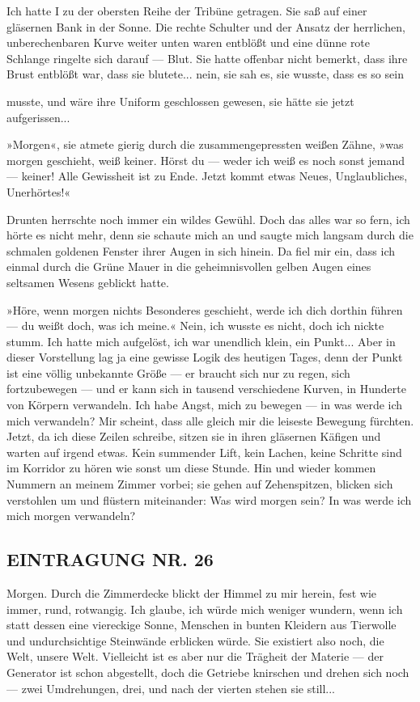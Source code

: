 Ich hatte I zu der obersten Reihe der Tribüne getragen. Sie saß auf
einer gläsernen Bank in der Sonne. Die rechte Schulter und der
Ansatz der herrlichen, unberechenbaren Kurve weiter unten waren
entblößt und eine dünne rote Schlange ringelte sich darauf — Blut.
Sie hatte offenbar nicht bemerkt, dass ihre Brust entblößt war,
dass sie blutete... nein, sie sah es, sie wusste, dass es so sein

musste, und wäre ihre Uniform geschlossen gewesen, sie hätte sie
jetzt aufgerissen...

»Morgen«, sie atmete gierig durch die zusammengepressten weißen
Zähne, »was morgen geschieht, weiß keiner. Hörst du — weder ich
weiß es noch sonst jemand — keiner! Alle Gewissheit ist zu Ende.
Jetzt kommt etwas Neues, Unglaubliches, Unerhörtes!«

Drunten herrschte noch immer ein wildes Gewühl. Doch das alles war
so fern, ich hörte es nicht mehr, denn sie schaute mich an und
saugte mich langsam durch die schmalen goldenen Fenster ihrer Augen
in sich hinein. Da fiel mir ein, dass ich einmal durch die Grüne
Mauer in die geheimnisvollen gelben Augen eines seltsamen Wesens
geblickt hatte.

»Höre, wenn morgen nichts Besonderes geschieht, werde ich dich
dorthin führen — du weißt doch, was ich meine.« Nein, ich wusste es
nicht, doch ich nickte stumm. Ich hatte mich aufgelöst, ich war
unendlich klein, ein Punkt... Aber in dieser Vorstellung lag ja
eine gewisse Logik des heutigen Tages, denn der Punkt ist eine
völlig unbekannte Größe — er braucht sich nur zu regen, sich
fortzubewegen — und er kann sich in tausend verschiedene Kurven, in
Hunderte von Körpern verwandeln. Ich habe Angst, mich zu bewegen —
in was werde ich mich verwandeln? Mir scheint, dass alle gleich mir
die leiseste Bewegung fürchten. Jetzt, da ich diese Zeilen
schreibe, sitzen sie in ihren gläsernen Käfigen und warten auf
irgend etwas. Kein summender Lift, kein Lachen, keine Schritte sind
im Korridor zu hören wie sonst um diese Stunde. Hin und wieder
kommen Nummern an meinem Zimmer vorbei; sie gehen auf Zehenspitzen,
blicken sich verstohlen um und flüstern miteinander: Was wird
morgen sein? In was werde ich mich morgen verwandeln?

\subsection{EINTRAGUNG NR. 26}

Morgen. Durch die Zimmerdecke blickt der Himmel zu mir herein, fest
wie immer, rund, rotwangig. Ich glaube, ich würde mich weniger
wundern, wenn ich statt dessen eine viereckige Sonne, Menschen in
bunten Kleidern aus Tierwolle und undurchsichtige Steinwände
erblicken würde. Sie existiert also noch, die Welt, unsere Welt.
Vielleicht ist es aber nur die Trägheit der Materie — der Generator
ist schon abgestellt, doch die Getriebe knirschen und drehen sich
noch — zwei Umdrehungen, drei, und nach der vierten stehen sie
still...

